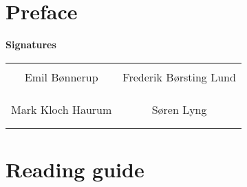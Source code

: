 \chapter*{Preface}


{\Huge\textbf{Signatures}}
\newline
\newline


\begin{table}[H]
	\centering
	\begin{tabular}{c c}
		\underline{\phantom{mmmmmmmmmmmmmm}} & \underline{\phantom{mmmmmmmmmmmmmm}} \\
		Emil Bønnerup			& Frederik Børsting Lund	\\
		&\\
		&\\
		\underline{\phantom{mmmmmmmmmmmmmm}} & \underline{\phantom{mmmmmmmmmmmmmm}} \\
		Mark Kloch Haurum 		& Søren Lyng 				\\
		&\\
		&\\
		
	\end{tabular}
\end{table}


\chapter*{Reading guide}


